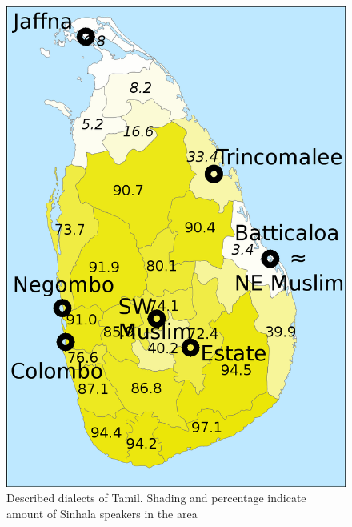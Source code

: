 \documentclass[a4paper,utf8]{article}
\begin{document}
\begin{figure}
\centering
 \includegraphics[height=.4\textheight]{describedtamildialects.png}
 \caption{Described dialects of Tamil. Shading and percentage indicate amount of Sinhala speakers in the area}
\end{figure}
\end{document}
